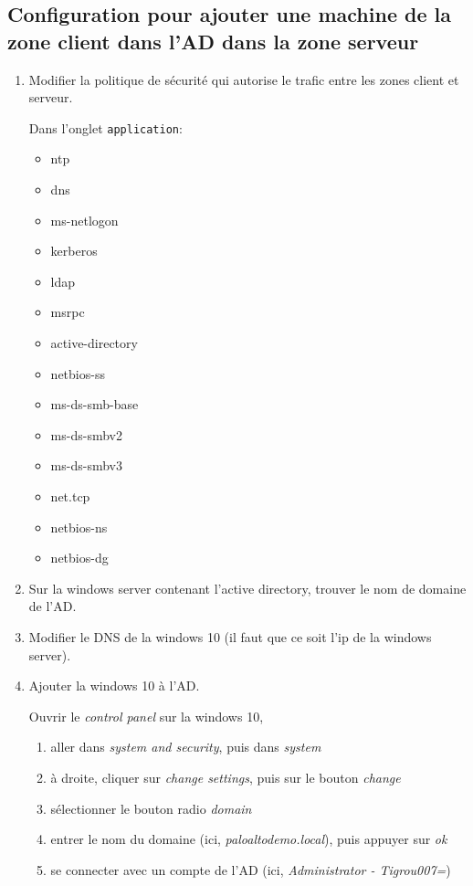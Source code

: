 \documentclass[a4paper]{article}
\begin{document}
\subsection{Configuration pour ajouter une machine de la zone client dans l'AD dans la zone serveur}





\begin{enumerate}
    \item Modifier la politique de sécurité qui autorise le trafic entre les zones client et serveur.
    \begin{example}
        Dans l'onglet \texttt{application}:
        \begin{itemize}
            \item ntp
            \item dns
            \item ms-netlogon
            \item kerberos
            \item ldap
            \item msrpc
            \item active-directory
            \item netbios-ss
            \item ms-ds-smb-base
            \item ms-ds-smbv2
            \item ms-ds-smbv3
            \item net.tcp
            \item netbios-ns
            \item netbios-dg
        \end{itemize}
    \end{example}
    \item Sur la windows server contenant l'active directory, trouver le nom de domaine de l'AD.
    \item Modifier le DNS de la windows 10 (il faut que ce soit l'ip de la windows server).
    \item Ajouter la windows 10 à l'AD.
    \begin{example}
        Ouvrir le \textit{control panel} sur la windows 10,
        \begin{enumerate}
            \item aller dans \textit{system and security}, puis dans \textit{system}
            \item à droite, cliquer sur \textit{change settings}, puis sur le bouton \textit{change}
            \item sélectionner le bouton radio \textit{domain}
            \item entrer le nom du domaine (ici, \textit{paloaltodemo.local}), puis appuyer sur \textit{ok}
            \item se connecter avec un compte de l'AD (ici, \textit{Administrator - Tigrou007=})
        \end{enumerate}
    \end{example}
\end{enumerate}
\end{document}
